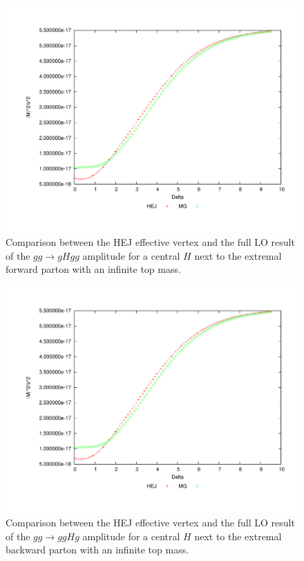 \begin{figure}[t]
\centering
\includegraphics[scale=0.45]{Images/gg_cen1.pdf}
\caption{Comparison between the HEJ effective vertex and the full LO result of the $gg \to gHgg$ amplitude for a central $H$ next to the extremal forward parton with an infinite top mass.}
\label{fig:gg_ggh_2}
\end{figure}

\begin{figure}[t]
\centering
\includegraphics[scale=0.45]{Images/gg_cen2.pdf}
\caption{Comparison between the HEJ effective vertex and the full LO result of the $gg \to ggHg$ amplitude for a central $H$ next to the extremal backward parton with an infinite top mass.}
\label{fig:gg_ggh_3}
\end{figure}


